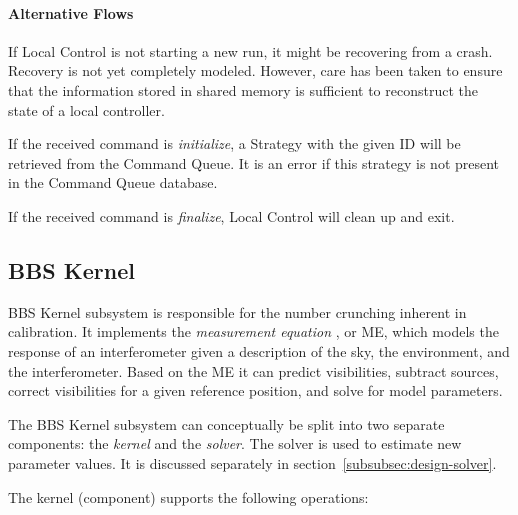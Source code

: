 \documentclass[10pt]{lofar}
\begin{document}
\paragraph*{Alternative Flows}
If Local Control is not starting a new run, it might be recovering from a
crash. Recovery is not yet completely modeled. However, care has been taken
to ensure that the information stored in shared memory is sufficient to
reconstruct the state of a local controller.

If the received command is \textit{initialize}, a Strategy with the given ID
will be retrieved from the Command Queue. It is an error if this strategy is not
present in the Command Queue database.

If the received command is \textit{finalize}, Local Control will clean up and
exit.

\subsection{BBS Kernel}
\label{subsec:design-kernel}

BBS Kernel subsystem is responsible for the number crunching inherent in
calibration. It implements the \emph{measurement equation} \cite{Hamaker1996-1,
aips++note185}, or ME, which models the response of an interferometer given a
description of the sky, the environment, and the interferometer. Based on the
ME it can predict visibilities, subtract sources, correct visibilities for a
given reference position, and solve for model parameters.

The BBS Kernel subsystem can conceptually be split into two separate components:
the \emph{kernel} and the \emph{solver}. The solver is used to estimate new
parameter values. It is discussed separately in
section~\ref{subsubsec:design-solver}.

The kernel (component) supports the following operations:
\end{document}
